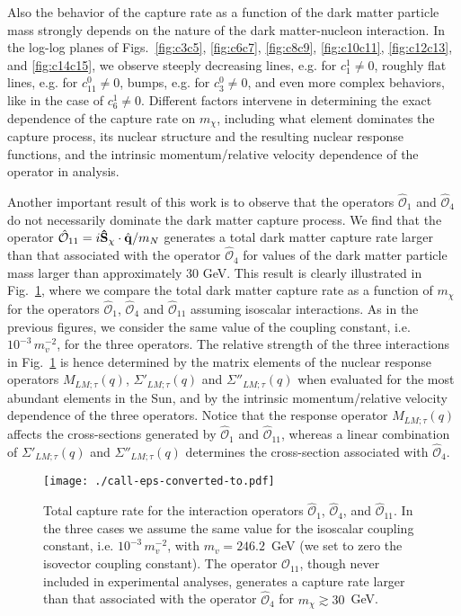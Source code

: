\documentclass[11pt,a4paper]{article}
\begin{document}
Also the behavior of the capture rate as a function of the dark matter particle mass strongly depends on the nature of the dark matter-nucleon interaction. In the log-log planes of Figs.~\ref{fig:c3c5}, \ref{fig:c6c7}, \ref{fig:c8c9}, \ref{fig:c10c11}, \ref{fig:c12c13}, and \ref{fig:c14c15}, we observe steeply decreasing lines, e.g. for $c_1^1\neq 0$, roughly flat lines, e.g. for $c_{11}^0\neq 0$, bumps, e.g. for $c_3^0\neq 0$, and even more complex behaviors, like in the case of $c_6^1\neq 0$. Different factors intervene in determining the exact dependence of the capture rate on $m_\chi$, including what element dominates the capture process, its nuclear structure and the resulting nuclear response functions, and the intrinsic momentum/relative velocity dependence of the operator in analysis. 

Another important result of this work is to observe that the operators $\hat{\mathcal{O}}_1$ and $\hat{\mathcal{O}}_4$ do not necessarily dominate the dark matter capture process. We find that the operator $\hat{\mathcal{O}}_{11} = i{\bf{\hat{S}}}_\chi\cdot{\hat{\bf{q}}}/m_N$ generates a total dark matter capture rate larger than that associated with the operator $\hat{\mathcal{O}}_4$ for values of the dark matter particle mass larger than approximately 30 GeV. This result is clearly illustrated in Fig.~\ref{fig:c1c4c11}, where we compare the total dark matter capture rate as a function of $m_\chi$ for the operators $\hat{\mathcal{O}}_1$, $\hat{\mathcal{O}}_4$ and $\hat{\mathcal{O}}_{11}$ assuming isoscalar interactions. As in the previous figures, we consider the same value of the coupling constant, i.e. $10^{-3}\,m_v^{-2}$, for the three operators. The relative strength of the three interactions in Fig.~\ref{fig:c1c4c11} is hence determined by the matrix elements of the nuclear response operators $M_{LM;\tau}(q)$, $\Sigma'_{LM;\tau}(q)$ and $\Sigma''_{LM;\tau}(q)$ when evaluated for the most abundant elements in the Sun, and by the intrinsic momentum/relative velocity dependence of the three operators. Notice that the response operator $M_{LM;\tau}(q)$ affects the cross-sections generated by $\hat{\mathcal{O}}_1$ and $\hat{\mathcal{O}}_{11}$, whereas a linear combination of $\Sigma'_{LM;\tau}(q)$ and $\Sigma''_{LM;\tau}(q)$ determines the cross-section associated with $\hat{\mathcal{O}}_{4}$.

\begin{figure}[t]
\begin{center}
\texttt{[image: ./call-eps-converted-to.pdf]}
\end{center}
\caption{Total capture rate for the interaction operators $\hat{\mathcal{O}}_1$, $\hat{\mathcal{O}}_4$, and $\hat{\mathcal{O}}_{11}$. In the three cases we assume the same value for the isoscalar coupling constant, i.e. $10^{-3}\,m_v^{-2}$, with $m_v=246.2$~GeV (we set to zero the isovector coupling constant). The operator $\hat{\mathcal{O}}_{11}$, though never included in experimental analyses, generates a capture rate larger than that associated with the operator $\hat{\mathcal{O}}_4$ for $m_\chi\gtrsim30$~GeV.}
\label{fig:c1c4c11}
\end{figure}
\end{document}
